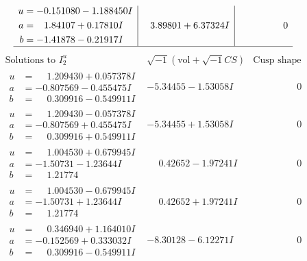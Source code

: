\documentclass[1p]{elsarticle_modified}
\theoremstyle{definition}
\newcommand{\I}{\sqrt{-1}}
\begin{document}
$$\begin{array}{c|c|c}
\begin{aligned}
u &= -0.151080 - 1.188450 I \\
a &= \phantom{-}1.84107 + 0.17810 I \\
b &= -1.41878 - 0.21917 I\end{aligned}
 & \phantom{-}3.89801 + 6.37324 I & \phantom{-0.000000 } 0\\
 \hline 
 \end{array}$$\newpage$$\begin{array}{c|c|c}  
\text{Solutions to }I^u_{2}& \I (\text{vol} + \sqrt{-1}CS) & \text{Cusp shape}\\
 \hline 
\begin{aligned}
u &= \phantom{-}1.209430 + 0.057378 I \\
a &= -0.807569 - 0.455475 I \\
b &= \phantom{-}0.309916 - 0.549911 I\end{aligned}
 & -5.34455 - 1.53058 I & \phantom{-0.000000 } 0 \\ \hline\begin{aligned}
u &= \phantom{-}1.209430 - 0.057378 I \\
a &= -0.807569 + 0.455475 I \\
b &= \phantom{-}0.309916 + 0.549911 I\end{aligned}
 & -5.34455 + 1.53058 I & \phantom{-0.000000 } 0 \\ \hline\begin{aligned}
u &= \phantom{-}1.004530 + 0.679945 I \\
a &= -1.50731 - 1.23644 I \\
b &= \phantom{-}1.21774\phantom{ +0.000000I}\end{aligned}
 & \phantom{-}0.42652 - 1.97241 I & \phantom{-0.000000 } 0 \\ \hline\begin{aligned}
u &= \phantom{-}1.004530 - 0.679945 I \\
a &= -1.50731 + 1.23644 I \\
b &= \phantom{-}1.21774\phantom{ +0.000000I}\end{aligned}
 & \phantom{-}0.42652 + 1.97241 I & \phantom{-0.000000 } 0 \\ \hline\begin{aligned}
u &= \phantom{-}0.346940 + 1.164010 I \\
a &= -0.152569 + 0.333032 I \\
b &= \phantom{-}0.309916 - 0.549911 I\end{aligned}
 & -8.30128 - 6.12271 I & \phantom{-0.000000 } 0 \\ \hline\begin{aligned}

\end{aligned}
\end{array}$$
\end{document}

